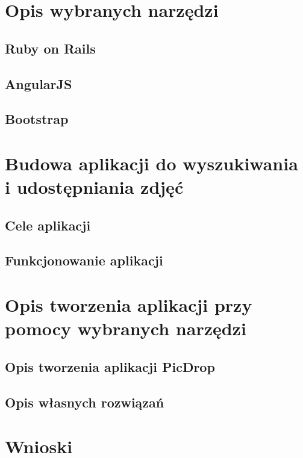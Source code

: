 \documentclass[brudnopis]{xmgr}
\begin{document}
\chapter{Opis wybranych narzędzi\label{s:xsl}}

\section{Ruby on Rails}

\section{AngularJS}

\section{Bootstrap}

\chapter{Budowa aplikacji do wyszukiwania i udostępniania zdjęć }

\section{Cele aplikacji}

\section{Funkcjonowanie aplikacji}

\chapter{Opis tworzenia aplikacji przy pomocy wybranych narzędzi\label{PRZEGLAD.NARZEDZI}}

\section{Opis tworzenia aplikacji PicDrop}

\section{Opis własnych rozwiązań}   

\chapter{Wnioski}
\end{document}
